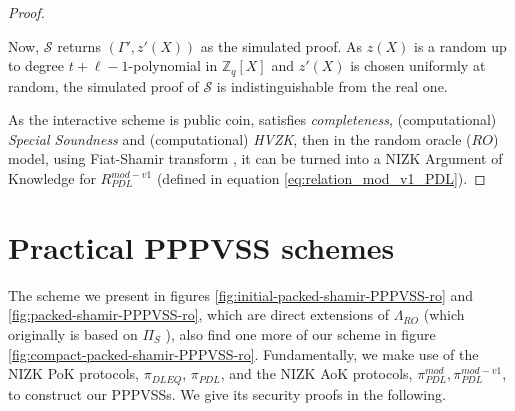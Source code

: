 \begin{proof}
\begin{itemize}
      Now, $\mathcal{S}$ returns $(\Gamma',z'(X))$ as the simulated proof. As $z(X)$ is a random 
      up to degree $t+\ell-1$-polynomial in $\mathbb{Z}_q[X]$ and $z'(X)$ is chosen uniformly at random, 
      the simulated proof of $\mathcal{S}$ is indistinguishable from the real one.
  \end{itemize}
  As the interactive scheme is public coin, satisfies \textit{completeness}, (computational) \textit{Special Soundness} 
  and (computational) \textit{HVZK}, then in the random oracle ($RO$) model, using Fiat-Shamir transform \cite{10.1007/3-540-47721-7_12}, 
  it can be turned into a NIZK Argument of Knowledge for $R_{PDL}^{mod-v1}$ (defined in equation \ref{eq:relation_mod_v1_PDL}).
\end{proof}


\section{Practical PPPVSS schemes}

The scheme we present in figures \ref{fig:initial-packed-shamir-PPPVSS-ro} and \ref{fig:packed-shamir-PPPVSS-ro}, which are direct extensions of $\Lambda_{RO}$ \cite{cryptoeprint:2025/576} 
(which originally is based on $\Pi_S$ \cite{cryptoeprint:2023/1669}), also find one more of our scheme in 
figure \ref{fig:compact-packed-shamir-PPPVSS-ro}. Fundamentally, we make use of the NIZK 
PoK protocols, $\pi_{DLEQ}$, $\pi_{PDL}$, and the NIZK AoK protocols, $\pi_{PDL}^{mod},\pi_{PDL}^{mod-v1}$, to construct our PPPVSSs. We give its security proofs in the following. 







